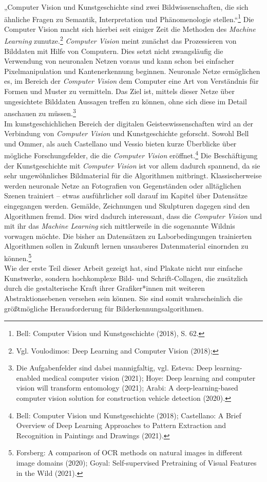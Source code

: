 \documentclass[a4paper,12pt,ngerman]{article}
\begin{document}
„Computer Vision und Kunstgeschichte sind zwei Bildwissenschaften, die sich ähnliche Fragen zu Semantik, Interpretation und Phänomenologie stellen.“\footnote{Bell: Computer Vision und Kunstgeschichte (2018), S. 62.} Die Computer Vision macht sich hierbei seit einiger Zeit die Methoden des \textit{Machine Learning} zunutze.\footnote{Vgl. Voulodimos: Deep Learning and Computer Vision (2018); } \textit{Computer Vision} meint zunächst das Prozessieren von Bilddaten mit Hilfe von Computern. Dies setzt nicht zwangsläufig die Verwendung von neuronalen Netzen voraus und kann schon bei einfacher Pixelmanipulation und Kantenerkennung beginnen. Neuronale Netze ermöglichen es, im Bereich der \textit{Computer Vision} dem Computer eine Art von Verständnis für Formen und Muster zu vermitteln. Das Ziel ist, mittels dieser Netze über ungesichtete Bilddaten Aussagen treffen zu können, ohne sich diese im Detail anschauen zu müssen.\footnote{Die Aufgabenfelder sind dabei mannigfaltig, vgl. Esteva: Deep learning-enabled medical computer vision (2021); Hoye: Deep learning and computer vision will transform entomology (2021); Arabi: A deep-learning-based computer vision solution for construction vehicle detection (2020).} \\
Im kunstgeschichlichen Bereich der digitalen Geisteswissenschaften wird an der Verbindung von \textit{Computer Vision} und Kunstgeschichte geforscht. Sowohl Bell und Ommer, als auch Castellano und Vessio bieten kurze Überblicke über mögliche Forschungsfelder, die die \textit{Computer Vision} eröffnet.\footnote{Bell: Computer Vision und Kunstgeschichte (2018); Castellano: A Brief Overview of Deep Learning Approaches to Pattern Extraction and Recognition in Paintings and Drawings (2021).} Die Beschäftigung der Kunstgeschichte mit \textit{Computer Vision} ist vor allem dadurch spannend, da sie sehr ungewöhnliches Bildmaterial für die Algorithmen mitbringt. Klassischerweise werden neuronale Netze an Fotografien von Gegenständen oder alltäglichen Szenen trainiert -- etwas ausführlicher soll darauf im Kapitel über Datensätze eingegangen werden. Gemälde, Zeichnungen und Skulpturen dagegen sind den Algorithmen fremd. Dies wird dadurch interessant, dass die \textit{Computer Vision} und mit ihr das \textit{Machine Learning} sich mittlerweile in die sogenannte Wildnis vorwagen möchte. Die bisher an Datensätzen zu Laborbedingungen trainierten Algorithmen sollen in Zukunft lernen unsauberes Datenmaterial einornden zu können.\footnote{Forsberg: A comparison of OCR methods on natural images in different image domains (2020); Goyal: Self-supervised Pretraining of Visual Features in the Wild (2021).}\\
Wie der erste Teil dieser Arbeit gezeigt hat, sind Plakate nicht nur einfache Kunstwerke, sondern hochkomplexe Bild- und Schrift-Collagen, die zusätzlich durch die gestalterische Kraft ihrer Grafiker*innen mit weiteren Abstraktionsebenen versehen sein können. Sie sind somit wahrscheinlich die größtmögliche Herausforderung für Bilderkennungsalgorithmen. \\
\end{document}
